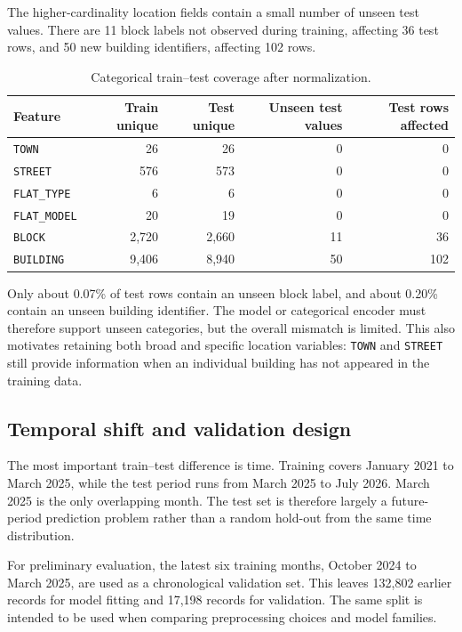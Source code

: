 \documentclass[10pt]{article}
\begin{document}
The higher-cardinality location fields contain a small number of unseen test values.
There are 11 block labels not observed during training, affecting 36 test rows, and 50 new building identifiers, affecting 102 rows.

\begin{table}[h]
\centering
\small
\begin{tabular}{lrrrr}
\toprule
Feature & Train unique & Test unique & Unseen test values & Test rows affected \\
\midrule
\texttt{TOWN} & 26 & 26 & 0 & 0 \\
\texttt{STREET} & 576 & 573 & 0 & 0 \\
\texttt{FLAT\_TYPE} & 6 & 6 & 0 & 0 \\
\texttt{FLAT\_MODEL} & 20 & 19 & 0 & 0 \\
\texttt{BLOCK} & 2{,}720 & 2{,}660 & 11 & 36 \\
\texttt{BUILDING} & 9{,}406 & 8{,}940 & 50 & 102 \\
\bottomrule
\end{tabular}
\caption{Categorical train--test coverage after normalization.}
\label{tab:train-test-category-coverage}
\end{table}

Only about 0.07\% of test rows contain an unseen block label, and about 0.20\% contain an unseen building identifier.
The model or categorical encoder must therefore support unseen categories, but the overall mismatch is limited.
This also motivates retaining both broad and specific location variables: \texttt{TOWN} and \texttt{STREET} still provide information when an individual building has not appeared in the training data.

\subsection{Temporal shift and validation design}

The most important train--test difference is time.
Training covers January 2021 to March 2025, while the test period runs from March 2025 to July 2026.
March 2025 is the only overlapping month.
The test set is therefore largely a future-period prediction problem rather than a random hold-out from the same time distribution.

For preliminary evaluation, the latest six training months, October 2024 to March 2025, are used as a chronological validation set.
This leaves 132{,}802 earlier records for model fitting and 17{,}198 records for validation.
The same split is intended to be used when comparing preprocessing choices and model families.
\end{document}
